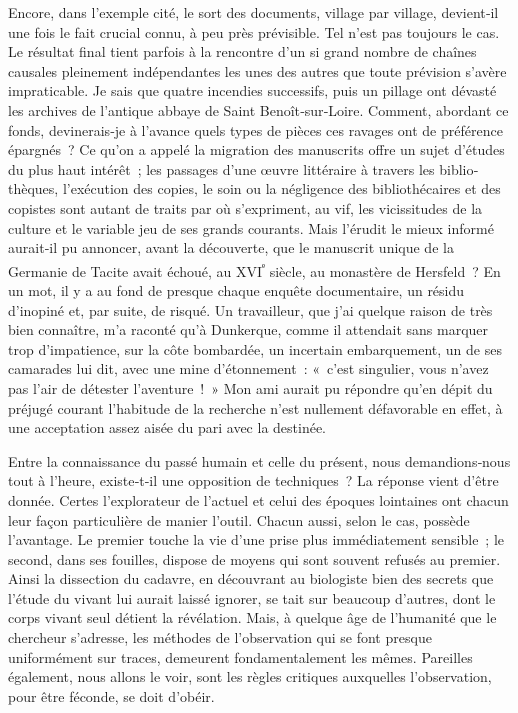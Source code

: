 \documentclass[french,twoside]{book} %
\begin{document}
Encore, dans l’exemple cité, le sort des documents, village par village, devient‑il une fois le fait crucial connu, à peu près prévisible. Tel n’est pas toujours le cas. Le résultat final tient parfois à la rencontre d’un si grand nombre de chaînes causales pleinement indépendantes les unes des autres que toute prévision s’avère impraticable. Je sais que quatre incen­dies successifs, puis un pillage ont dévasté les archives de l’antique abbaye de Saint Benoît‑sur‑Loire. Comment, abordant ce fonds, devinerais‑je à l’avance quels types de pièces ces ravages ont de préférence épargnés ? Ce qu’on a appelé la migration des manuscrits offre un sujet d’études du plus haut intérêt ; les passages d’une œuvre littéraire à travers les biblio­thèques, l’exécution des copies, le soin ou la négligence des bibliothécaires et des copistes sont autant de traits par où s’expriment, au vif, les vicis­situdes de la culture et le variable jeu de ses grands courants. Mais l’érudit le mieux informé aurait‑il pu annoncer, avant la découverte, que le manuscrit unique de la Germanie de Tacite avait échoué, au XVI\textsuperscript{ᵉ} siècle, au monastère de Hersfeld ? En un mot, il y a au fond de presque chaque enquête documentaire, un résidu d’inopiné et, par suite, de risqué. Un travailleur, que j’ai quelque raison de très bien connaître, m’a raconté qu’à Dunkerque, comme il attendait sans marquer trop d’impatience, sur la côte bombardée, un incertain embarquement, un de ses camarades lui dit, avec une mine d’étonnement : « c’est singulier, vous n’avez pas l’air de détester l’aventure ! » Mon ami aurait pu répondre qu’en dépit du préjugé courant l’habitude de la recherche n’est nullement défavorable en effet, à une acceptation assez aisée du pari avec la destinée.\par
Entre la connaissance du passé humain et celle du présent, nous deman­dions‑nous tout à l’heure, existe‑t‑il une opposition de techniques ? La réponse vient d’être donnée. Certes l’explorateur de l’actuel et celui des époques lointaines ont chacun leur façon particulière de manier l’outil. Chacun aussi, selon le cas, possède l’avantage. Le premier touche la vie d’une prise plus immédiatement sensible ; le second, dans ses fouilles, dispose de moyens qui sont souvent refusés au premier. Ainsi la dissection du cadavre, en découvrant au biologiste bien des secrets que l’étude du vivant lui aurait laissé ignorer, se tait sur beaucoup d’autres, dont le  
\label{p34} corps vivant seul détient la révélation. Mais, à quelque âge de l’humanité que le chercheur s’adresse, les méthodes de l’observation qui se font presque uniformément sur traces, demeurent fondamentalement les mêmes. Pareilles également, nous allons le voir, sont les règles critiques auxquelles l’observation, pour être féconde, se doit d’obéir.
\end{document}
